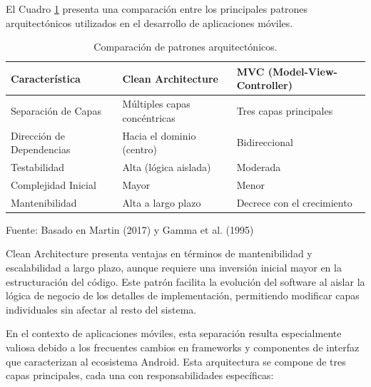 El Cuadro \ref{tab:architecture_comparison} presenta una comparación entre los principales patrones arquitectónicos utilizados en el desarrollo de aplicaciones móviles.

\begin{table}[H]
\centering
\begin{tabularx}{\linewidth}{p{3.5cm} p{4.5cm} p{4.5cm}}
\toprule
Característica & Clean Architecture & MVC (Model-View-Controller) \\
\midrule
Separación de Capas & Múltiples capas concéntricas & Tres capas principales \\
Dirección de Dependencias & Hacia el dominio (centro) & Bidireccional \\
Testabilidad & Alta (lógica aislada) & Moderada \\
Complejidad Inicial & Mayor & Menor \\
Mantenibilidad & Alta a largo plazo & Decrece con el crecimiento \\
\bottomrule
\end{tabularx}
\caption{Comparación de patrones arquitectónicos.}\label{tab:architecture_comparison}
Fuente: Basado en Martin (2017) \cite{martin2017-cleanarch} y Gamma et al. (1995) \cite{gamma1995-patterns}
\end{table}

Clean Architecture presenta ventajas en términos de mantenibilidad y escalabilidad a largo plazo, aunque requiere una inversión inicial mayor en la estructuración del código. Este patrón facilita la evolución del software al aislar la lógica de negocio de los detalles de implementación, permitiendo modificar capas individuales sin afectar al resto del sistema.

En el contexto de aplicaciones móviles, esta separación resulta especialmente valiosa debido a los frecuentes cambios en frameworks y componentes de interfaz que caracterizan al ecosistema Android. Esta arquitectura se compone de tres capas principales, cada una con responsabilidades específicas:

